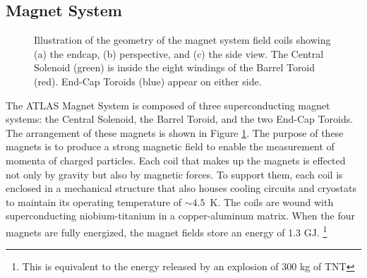 \subsection{Magnet System}
\begin{figure}[h!]
\captionsetup[subfigure]{position=b}
\centering
{}
\caption{Illustration of the geometry of the magnet system field coils showing (a) the endcap, (b) perspective, and (c) the side view. The Central Solenoid (green) is inside the eight windings of the Barrel Toroid (red). End-Cap Toroids (blue) appear on either side.
}
\label{fig:atlasMagnets}
\end{figure}

The ATLAS Magnet System is composed of three superconducting magnet systems: the Central Solenoid, the Barrel Toroid, and the two End-Cap Toroids.
The arrangement of these magnets is shown in Figure \ref{fig:atlasMagnets}.
The purpose of these magnets is to produce a strong magnetic field to enable the measurement of momenta of charged particles.
Each coil that makes up the magnets is effected not only by gravity but also by magnetic forces.
To support them, each coil is enclosed in a mechanical structure that also houses cooling circuits and cryostats to maintain its operating temperature of $\sim4.5$~K.
The coils are wound with superconducting niobium-titanium in a copper-aluminum matrix.
When the four magnets are fully energized, the magnet fields store an energy of 1.3 GJ. \footnote{This is equivalent to the energy released by an explosion of 300 kg of TNT}

